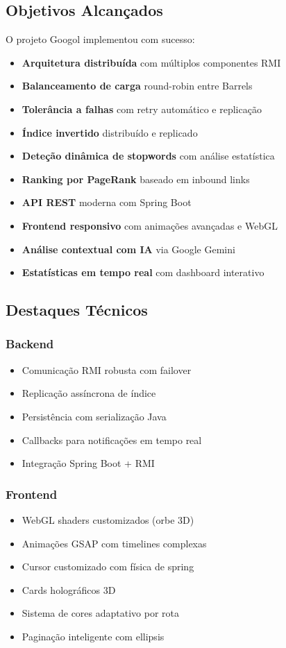 \documentclass[12pt,a4paper]{article}
\begin{document}
\subsection{Objetivos Alcançados}

O projeto Googol implementou com sucesso:
\begin{itemize}
    \item \textbf{Arquitetura distribuída} com múltiplos componentes RMI
    \item \textbf{Balanceamento de carga} round-robin entre Barrels
    \item \textbf{Tolerância a falhas} com retry automático e replicação
    \item \textbf{Índice invertido} distribuído e replicado
    \item \textbf{Deteção dinâmica de stopwords} com análise estatística
    \item \textbf{Ranking por PageRank} baseado em inbound links
    \item \textbf{API REST} moderna com Spring Boot
    \item \textbf{Frontend responsivo} com animações avançadas e WebGL
    \item \textbf{Análise contextual com IA} via Google Gemini
    \item \textbf{Estatísticas em tempo real} com dashboard interativo
\end{itemize}

\subsection{Destaques Técnicos}

\subsubsection{Backend}
\begin{itemize}
    \item Comunicação RMI robusta com failover
    \item Replicação assíncrona de índice
    \item Persistência com serialização Java
    \item Callbacks para notificações em tempo real
    \item Integração Spring Boot + RMI
\end{itemize}

\subsubsection{Frontend}
\begin{itemize}
    \item WebGL shaders customizados (orbe 3D)
    \item Animações GSAP com timelines complexas
    \item Cursor customizado com física de spring
    \item Cards holográficos 3D
    \item Sistema de cores adaptativo por rota
    \item Paginação inteligente com ellipsis
\end{itemize}
\end{document}
